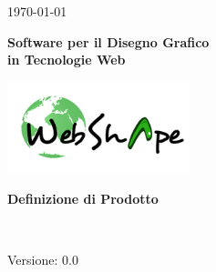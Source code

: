 
\title{\TITOLODOC}
\author{Stefano Dissegna}



\renewcommand{\insertversion}{0.0} %
\renewcommand{\TITOLODOC}{Definizione di Prodotto} %
\renewcommand{\glosspath}{.\glossario} %

\begin{titlepage}
\begin{center}
	\begin{Large}	\today \end{Large}
\end{center}

\vspace{20pt}

\begin{center}
	\begin{Huge}
				\textbf{\ajax}
	\end{Huge}
\end{center}			

\begin{center}
	\begin{large}
				\textbf{Software per il Disegno Grafico\\ in Tecnologie Web}
	\end{large}
\end{center}			

\vspace{20pt}

\begin{center}
\includegraphics[width=150pt]{../logo/logo}
\end{center}

\vspace{170pt}
\begin{center} %
	\begin{Huge}
				\textbf{\TITOLODOC}
	\end{Huge}
			\\
\end{center}
\vspace{190pt}
\begin{center}
Versione: \insertversion
\end{center}
\end{titlepage}

